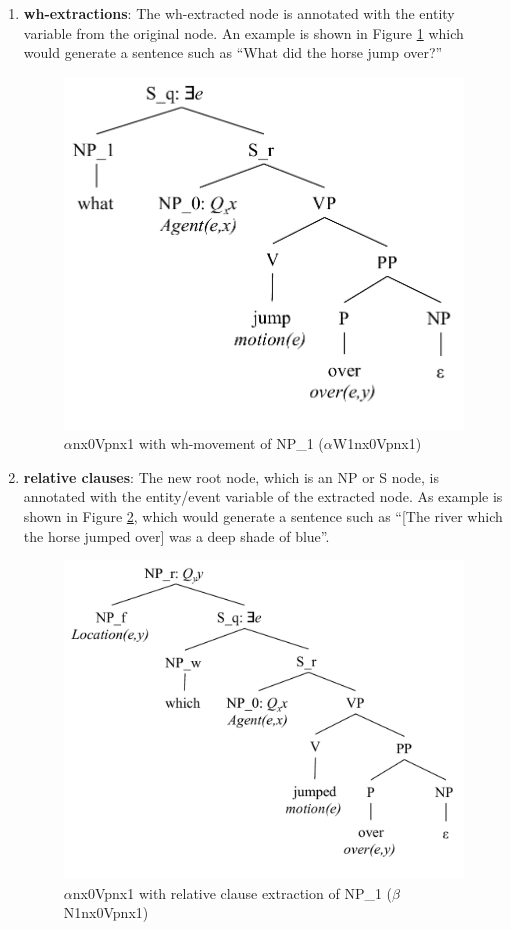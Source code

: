 \documentclass[11pt,a4paper]{article}
\begin{document}
\begin{enumerate}
    \item \textbf{wh-extractions}: The wh-extracted node is annotated with the entity variable from the original node. An example is shown in Figure \ref{fig:jump_wh_semantics} which would generate a sentence such as ``What did the horse jump over?''

    \begin{figure}[H]
    \begin{centering}
    \includegraphics[width=.6 \linewidth ]{resources/ch5_resources/jump_wh_semantics.pdf}
    \caption{$\alpha$nx0Vpnx1 with wh-movement of NP\_1 ($\alpha$W1nx0Vpnx1)}
    \label{fig:jump_wh_semantics}
    \end{centering}
    \end{figure}

    \item \textbf{relative clauses}: The new root node, which is an NP or S node, is annotated with the entity/event variable of the extracted node. As example is shown in Figure \ref{fig:jump_relclause_semantics}, which would generate a sentence such as ``[The river which the horse jumped over] was a deep shade of blue''.

    \begin{figure}[H]
    \begin{centering}
    \includegraphics[width=.8 \linewidth ]{resources/ch5_resources/jump_relclause_semantics.pdf}
    \caption{$\alpha$nx0Vpnx1 with relative clause extraction of NP\_1 ($\beta$N1nx0Vpnx1)}
    \label{fig:jump_relclause_semantics}
    \end{centering}
    \end{figure}


\end{enumerate}
\end{document}
